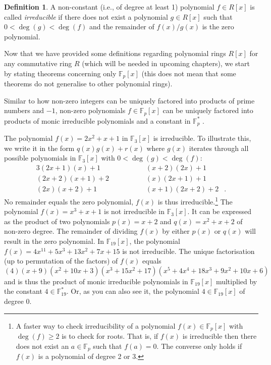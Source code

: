 \documentclass[openany, a4paper, 10pt]{book}
\theoremstyle{plain}
\theoremstyle{plain}
\theoremstyle{plain}
\theoremstyle{definition}
\newtheorem{definition}[theorem]{Definition}
\theoremstyle{plain}
\theoremstyle{definition}
\theoremstyle{remark}
\begin{document}
\begin{definition}\label{is_irreducible}
    A non-constant (i.e., of degree at least 1) polynomial $f \in R[x]$ is called \textit{irreducible} if there
    does not exist a polynomial $g \in R[x]$ such that $0 < \deg(g) < \deg(f)$
    and the remainder of $f(x)/g(x)$ is the zero polynomial.
\end{definition}
Now that we have provided some definitions regarding polynomial rings $R[x]$ for any commutative ring $R$ (which will be needed in upcoming chapters), we start by stating theorems concerning only $\mathbb F_p[x]$ (this does not mean that some theorems do not generalise to other polynomial rings).

Similar to how non-zero integers can be uniquely factored into products of prime numbers and $-1$,
non-zero polynomials $f \in \mathbb F_p[x]$ can be uniquely factored into products of monic irreducible polynomials and a constant in $\mathbb F_p^*$ \cite[Theorem~1.2.17]{dictaat_joost}.

\begin{examplebox}
    The polynomial $f(x)=2x^2+x+1$ in $\mathbb F_3[x]$ is irreducible.
    To illustrate this, we write it in the form $q(x) g(x) + r(x)$ where $g(x)$ iterates through all possible polynomials in $\mathbb F_3[x]$ with $0 < \deg(g) < \deg(f)$:
    \vspace{-.5em}
    {\allowdisplaybreaks\begin{alignat*}{3}
        (2x+1    )(x   ) + 1 &&       && (x+2     )(2x  ) + 1& \\
        (2x+2    )(x +1) + 2 &&       && (x       )(2x+1) + 1& \\
        (2x      )(x +2) + 1 &&\qquad && (x+1     )(2x+2) + 2&.
    \end{alignat*}
    }%
    \vspace{-.5em}
    No remainder equals the zero polynomial, $f(x)$ is thus irreducible.\footnote{
        A faster way to check irreducibility of a polynomial $f(x) \in \mathbb F_p[x]$ with $\deg(f) \geq 2$
        is to check for roots.
        That is, if $f(x)$ is irreducible then there does not exist an $a \in \mathbb F_p$
        such that $f(a) = 0$.
        The converse only holds if $f(x)$ is a polynomial of degree 2 or 3.
    }
    \tcbline
    The polynomial $f(x)=x^3+x+1$ is not irreducible in $\mathbb F_3[x]$.
    It can be expressed as the product of two polynomials $p(x)=x+2$ and $q(x)=x^2+x+2$ of non-zero degree.
    The remainder of dividing $f(x)$ by either $p(x)$ or $q(x)$ will result in the zero polynomial.
    \tcbline
    In $\mathbb F_{19}[x]$, the polynomial
    $f(x) = 4x^{11} + 5x^3 + 13x^2 + 7x + 15$
    is not irreducible.
    The unique factorisation (up to permutation of the factors) of $f(x)$ equals
    \begin{equation*}
        (4)(x + 9)(x^2 + 10x + 3)(x^3 + 15x^2 + 17)(x^5 + 4x^4 + 18x^3 + 9x^2 + 10x + 6)
    \end{equation*}
    and is thus the product of monic irreducible polynomials in $\mathbb F_{19}[x]$ multiplied by the constant $4\in \mathbb F_{19}^*$.
    Or, as you can also see it, the polynomial $4 \in \mathbb F_{19}[x]$ of degree 0.
\end{examplebox}
\end{document}
